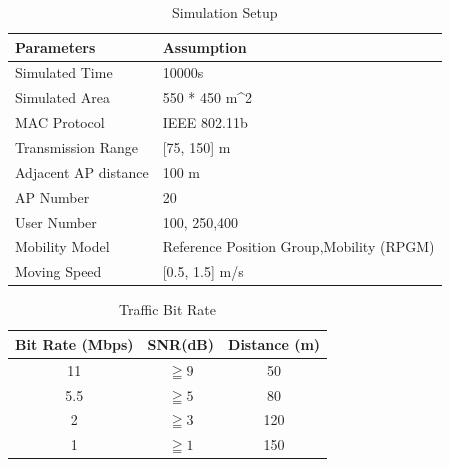 \begin{table}[H]
\setlength{\belowcaptionskip}{15pt}
\centering
\caption{Simulation Setup}
\label{tab:Simulation-Setup}
\begin{tabular}{@{}ll@{}}
\toprule
Parameters           & Assumption                               \\ \midrule
Simulated Time       & 10000s                                   \\
Simulated Area       & 550 * 450 m\textasciicircum 2            \\
MAC Protocol         & IEEE 802.11b                             \\
Transmission Range   & {[}75, 150{]} m                          \\
Adjacent AP distance & 100 m                                    \\
AP Number            & 20                                       \\
User Number          & 100, 250,400                             \\
Mobility Model       & Reference Position Group,Mobility (RPGM) \\
Moving Speed         & {[}0.5, 1.5{]} m/s                       \\ \bottomrule
\end{tabular}
\end{table}

\begin{table}[H]
\setlength{\belowcaptionskip}{15pt}
\centering
\caption{Traffic Bit Rate}
\label{tab:Traffic-Bit-Rate}
\begin{tabular}{@{}ccc@{}}
\toprule
\multicolumn{1}{l}{Bit Rate (Mbps)} & \multicolumn{1}{l}{SNR(dB)} & \multicolumn{1}{l}{Distance (m)} \\ \midrule
11                                  & $\geqq 9$                     & 50                               \\
5.5                                 & $\geqq 5$                   & 80                               \\
2                                   & $\geqq 3$                    & 120                              \\
1                                   & $\geqq 1$                     & 150                              \\ \bottomrule
\end{tabular}
\end{table}

